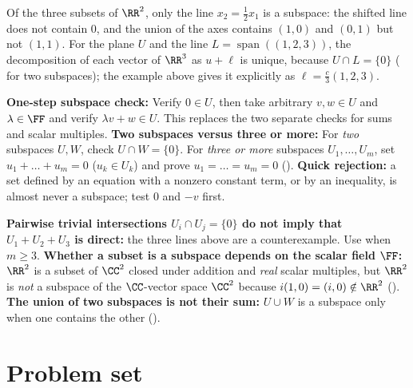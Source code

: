 \documentclass[10pt]{scrartcl}
\DeclareMathOperator{\spn}{span}
\begin{document}
\revisit Of the three subsets of $\RR^2$, only the line $x_2=\tfrac12x_1$ is a subspace: the shifted line does not contain $0$, and the union of the axes contains $(1,0)$ and $(0,1)$ but not $(1,1)$. For the plane $U$ and the line $L=\spn((1,2,3))$, the decomposition of each vector of $\RR^3$ as $u+\ell$ is unique, because $U\cap L=\{0\}$ ( for two subspaces); the example above gives it explicitly as $\ell=\tfrac c3(1,2,3)$.

\begin{shortcuts}
  \ii \textbf{One-step subspace check:} Verify $0\in U$, then take arbitrary $v,w\in U$ and $\lambda\in\FF$ and verify $\lambda v+w\in U$. This replaces the two separate checks for sums and scalar multiples.
  \ii \textbf{Two subspaces versus three or more:} For \emph{two} subspaces $U,W$, check $U\cap W=\{0\}$. For \emph{three or more} subspaces $U_1,\dots,U_m$, set $u_1+\dots+u_m=0$ ($u_k\in U_k$) and prove $u_1=\dots=u_m=0$ ().
  \ii \textbf{Quick rejection:} a set defined by an equation with a nonzero constant term, or by an inequality, is almost never a subspace; test $0$ and $-v$ first.
\end{shortcuts}

\begin{trapbox}
  \ii \textbf{Pairwise trivial intersections $U_i\cap U_j=\{0\}$ do not imply that $U_1+U_2+U_3$ is direct:} the three lines above are a counterexample. Use  when $m\ge 3$.
  \ii \textbf{Whether a subset is a subspace depends on the scalar field $\FF$:} $\RR^2$ is a subset of $\CC^2$ closed under addition and \emph{real} scalar multiples, but $\RR^2$ is \emph{not} a subspace of the $\CC$-vector space $\CC^2$ because $i(1,0)=(i,0)\notin\RR^2$ ().
  \ii \textbf{The union of two subspaces is not their sum:} $U\cup W$ is a subspace only when one contains the other ().
\end{trapbox}

\section{Problem set}
\end{document}
